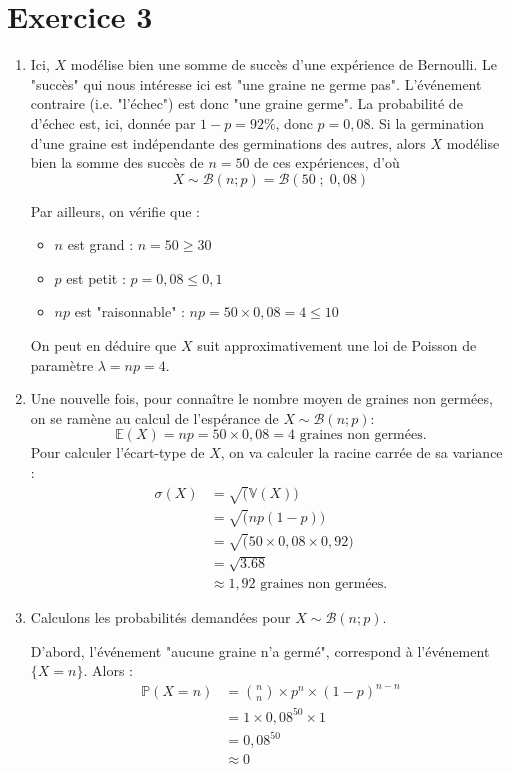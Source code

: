 \documentclass[a4paper,oneside,12pt]{article}
\theoremstyle{plain}
\def\V{\mathbb{V}}
\def\P{{\mathbb P}}
\def\E{{\mathbb E}}
\begin{document}
\section*{Exercice 3}

\begin{enumerate}
    \item Ici, $X$ modélise bien une somme de succès d'une expérience de Bernoulli. Le "succès" qui nous intéresse ici est "une graine ne germe pas". L'événement contraire (i.e. "l'échec") est donc "une graine germe". La probabilité de d'échec est, ici, donnée par $1-p = 92\%$, donc $p = 0,08$. Si la germination d'une graine est indépendante des germinations des autres, alors $X$ modélise bien la somme des succès de $n=50$ de ces expériences, d'où $$X \sim \mathcal{B}(n; p) = \mathcal{B}(50\;;\; 0,08)$$
    
    Par ailleurs, on vérifie que :
    \begin{itemize}
        \item $n$ est grand : $n=50 \ge 30$
        \item $p$ est petit : $p = 0,08\le0,1 $
        \item $np$ est "raisonnable" : $np = 50 \times 0,08 = 4 \le 10$
    \end{itemize}
    On peut en déduire que $X$ suit approximativement une loi de Poisson de paramètre $\lambda = np = 4$.
    
    \item Une nouvelle fois, pour connaître le nombre moyen de graines non germées, on se ramène au calcul de l'espérance de $X \sim \mathcal{B}(n; p)$:
    $$\E(X) = np = 50 \times 0,08 = 4 \mbox{ graines non germées.}$$
    Pour calculer l'écart-type de $X$, on va calculer la racine carrée de sa variance :
   \begin{align*}
       \sigma(X) &= \sqrt(\V(X)) \\
       &= \sqrt(np(1-p))\\
       &= \sqrt(50 \times 0,08 \times 0,92)\\
       &= \sqrt{3.68} \\
       &\approx 1,92 \mbox{ graines non germées.}
   \end{align*}
   
   \item Calculons les probabilités demandées pour $X \sim \mathcal{B}(n; p)$. 
   
    D'abord, l'événement "aucune graine n'a germé", correspond à l'événement $\{X = n\}$. Alors :
   \begin{align*}
       \P(X = n) &= \binom{n}{n}\times p^n\times (1-p)^{n-n}\\
       &= 1\times 0,08^{50}\times 1\\
       &= 0,08^{50} \\
       &\approx 0
   \end{align*}


\end{enumerate}
\end{document}
